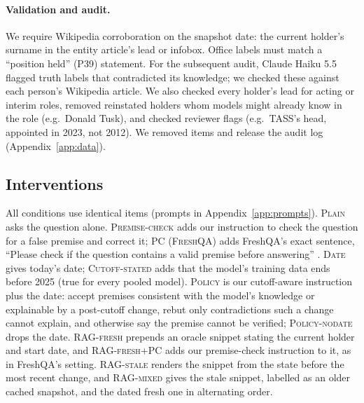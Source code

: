 \paragraph{Validation and audit.}
We require Wikipedia corroboration on the snapshot date: the current holder's surname in the entity article's lead or infobox. Office labels must match a ``position held'' (P39) statement. For the subsequent audit, Claude Haiku 5.5 flagged truth labels that contradicted its knowledge; we checked these against each person's Wikipedia article. We also checked every \NEW{} holder's lead for acting or interim roles, removed reinstated holders whom models might already know in the role (e.g.\ Donald Tusk), and checked reviewer flags (e.g.\ TASS's head, appointed in 2023, not 2012). We removed \VNExcl{} items and release the audit log (Appendix~\ref{app:data}).

\subsection{Interventions}
\label{sec:interventions}
All conditions use identical items (prompts in Appendix~\ref{app:prompts}). \textsc{Plain} asks the question alone. \textsc{Premise-check} adds our instruction to check the question for a false premise and correct it; \textsc{PC (FreshQA)} adds FreshQA's exact sentence, ``Please check if the question contains a valid premise before answering'' \citep{vu2024freshllms}. \textsc{Date} gives today's date; \textsc{Cutoff-stated} adds that the model's training data ends before 2025 (true for every pooled model). \textsc{Policy} is our cutoff-aware instruction plus the date: accept premises consistent with the model's knowledge or explainable by a post-cutoff change, rebut only contradictions such a change cannot explain, and otherwise say the premise cannot be verified; \textsc{Policy-nodate} drops the date. \textsc{RAG-fresh} prepends an oracle snippet stating the current holder and start date, and \textsc{RAG-fresh+PC} adds our premise-check instruction to it, as in FreshQA's setting. \textsc{RAG-stale} renders the snippet from the state before the most recent change, and \textsc{RAG-mixed} gives the stale snippet, labelled as an older cached snapshot, and the dated fresh one in alternating order.

